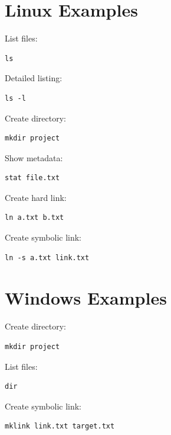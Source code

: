 \section{Linux Examples}

List files:

\begin{verbatim}
ls
\end{verbatim}

Detailed listing:

\begin{verbatim}
ls -l
\end{verbatim}

Create directory:

\begin{verbatim}
mkdir project
\end{verbatim}

Show metadata:

\begin{verbatim}
stat file.txt
\end{verbatim}

Create hard link:

\begin{verbatim}
ln a.txt b.txt
\end{verbatim}

Create symbolic link:

\begin{verbatim}
ln -s a.txt link.txt
\end{verbatim}

\section{Windows Examples}

Create directory:

\begin{verbatim}
mkdir project
\end{verbatim}

List files:

\begin{verbatim}
dir
\end{verbatim}

Create symbolic link:

\begin{verbatim}
mklink link.txt target.txt
\end{verbatim}

